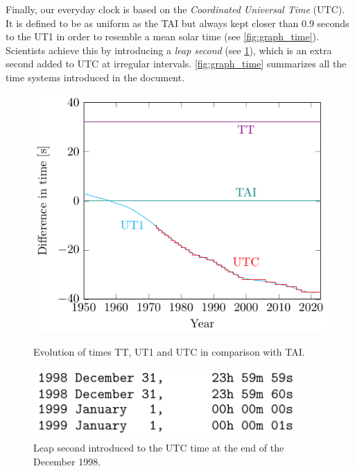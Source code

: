 \documentclass[../main.tex]{subfiles}
\begin{document}
Finally, our everyday clock is based on the \emph{Coordinated Universal Time} (UTC). It is defined to be as uniform as the TAI but always kept closer than 0.9 seconds to the UT1 in order to resemble a mean solar time (see \cref{fig:graph_time}). Scientists achieve this by introducing a \emph{leap second} (see \cref{fig:leapsecond}), which is an extra second added to UTC at irregular intervals. \cref{fig:graph_time} summarizes all the time systems introduced in the document.

\begin{figure}[htbp]
  \centering
  \begin{minipage}[ht]{0.45\textwidth}
    \centering
    \includegraphics[width=\textwidth]{Images/graph_time.pdf}
    \caption{Evolution of times TT, UT1 and UTC in comparison with TAI. \cite{iersDeltaT}}
    \label{fig:graph_time}
  \end{minipage}
  \hfill
  \begin{minipage}[ht]{0.45\textwidth}
    \centering
    \includegraphics[width=0.9\textwidth]{Images/leap_second.pdf}
    \caption{Leap second introduced to the UTC time at the end of the December 1998. \cite{iersbulletinC}}
    \label{fig:leapsecond}
  \end{minipage}
\end{figure}
\end{document}
